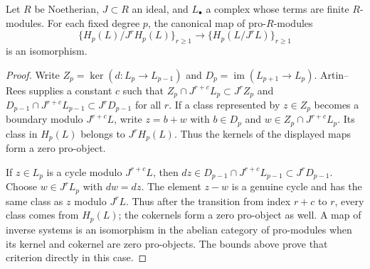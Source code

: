 \begin{lemma}\label{SA23-B1-2}
Let $R$ be Noetherian, $J\subset R$ an ideal, and $L_\bullet$ a
complex whose terms are finite $R$-modules.  For each fixed degree
$p$, the canonical map of pro-$R$-modules
\[
 \{H_p(L)/J^rH_p(L)\}_{r\ge1}
 \longrightarrow \{H_p(L/J^rL)\}_{r\ge1}
\]
is an isomorphism.
\end{lemma}
\begin{proof}
Write $Z_p=\ker(d:L_p\to L_{p-1})$ and
$D_p=\operatorname{im}(L_{p+1}\to L_p)$.  Artin--Rees supplies a
constant $c$ such that
$Z_p\cap J^{r+c}L_p\subset J^rZ_p$ and
$D_{p-1}\cap J^{r+c}L_{p-1}\subset J^rD_{p-1}$ for all $r$.
If a class represented by $z\in Z_p$ becomes a boundary modulo
$J^{r+c}L$, write $z=b+w$ with $b\in D_p$ and
$w\in Z_p\cap J^{r+c}L_p$.  Its class in $H_p(L)$ belongs to
$J^rH_p(L)$.  Thus the kernels of the displayed maps form a zero
pro-object.

If $z\in L_p$ is a cycle modulo $J^{r+c}L$, then
$dz\in D_{p-1}\cap J^{r+c}L_{p-1}\subset J^rD_{p-1}$.
Choose $w\in J^rL_p$ with $dw=dz$.  The element $z-w$ is a genuine
cycle and has the same class as $z$ modulo $J^rL$.  Thus after the
transition from index $r+c$ to $r$, every class comes from $H_p(L)$;
the cokernels form a zero pro-object as well.  A map of inverse
systems is an isomorphism in the abelian category of pro-modules
when its kernel and cokernel are zero pro-objects.  The bounds above
prove that criterion directly in this case.
\end{proof}

